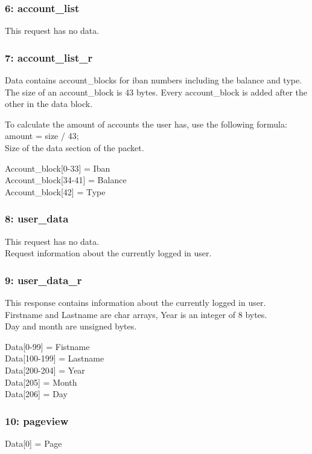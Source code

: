 \documentclass[12pt]{article}
\begin{document}
\subsubsection{6: account\_list}
This request has no data.

\subsubsection{7: account\_list\_r}
Data contains account\_blocks for iban numbers including the balance and type.\\
The size of an account\_block is 43 bytes.
Every account\_block is added after the other in the data block.

To calculate the amount of accounts the user has, use the following formula:\\
amount = size / 43;\\
Size of the data section of the packet.

Account\_block[0-33] = Iban\\
Account\_block[34-41] = Balance\\
Account\_block[42] = Type

\subsubsection{8: user\_data}
This request has no data.\\
Request information about the currently logged in user.

\subsubsection{9: user\_data\_r}
This response contains information about the currently logged in user.\\
Firstname and Lastname are char arrays, Year is an integer of 8 bytes.\\
Day and month are unsigned bytes.

Data[0-99] = Fistname\\
Data[100-199] = Lastname\\
Data[200-204] = Year\\
Data[205] = Month\\
Data[206] = Day

\subsubsection{10: pageview}
Data[0] = Page
\end{document}
